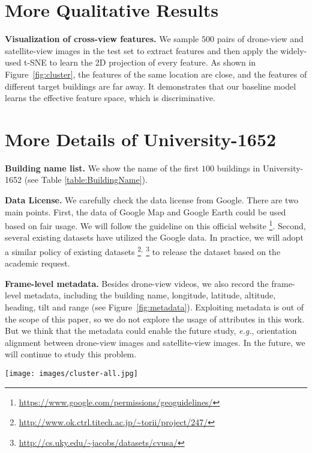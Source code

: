 \documentclass[sigconf]{acmart}
\def\eg{\emph{e.g.}}
\begin{document}
\section{More Qualitative Results}
\textbf{Visualization of cross-view features.} 
We sample $500$ pairs of drone-view and satellite-view images in the test set to extract features and then apply the widely-used t-SNE \cite{van2014accelerating} to learn the 2D projection of every feature. As shown in Figure~\ref{fig:cluster}, the features of the same location are close, and the features of different target buildings are far away. It demonstrates that our baseline model learns the effective feature space, which is discriminative.


\section{More Details of University-1652}

\textbf{Building name list.} We show the name of the first $100$ buildings in University-1652 (see Table \ref{table:BuildingName}). 

\noindent\textbf{Data License.} We carefully check the data license from Google. There are two main points.
First, the data of Google Map and Google Earth could be used based on fair usage. We will follow the guideline on this official website \footnote{\url{https://www.google.com/permissions/geoguidelines/}}.
Second, several existing datasets have utilized the Google data. In practice, we will adopt a similar policy of existing datasets \footnote{\url{http://www.ok.ctrl.titech.ac.jp/~torii/project/247/}}$^,$ 
\footnote{\url{http://cs.uky.edu/~jacobs/datasets/cvusa/}} to release the dataset based on the academic request. 

\noindent\textbf{Frame-level metadata.} Besides drone-view videos, we also record the frame-level metadata, including the building name, longitude, latitude, altitude, heading, tilt and range (see Figure~\ref{fig:metadata}). Exploiting metadata is out of the scope of this paper, so we do not explore the usage of attributes in this work. But we think that the metadata could enable the future study, \eg, orientation alignment between drone-view images and satellite-view images. In the future, we will continue to study this problem.





\begin{figure*}[t]
\begin{center}
    \texttt{[image: images/cluster-all.jpg]}
\end{center}
\caption{Visualization of cross-view features using t-SNE \cite{van2014accelerating} on University-1652. (Best viewed when zoomed in.)
     }\label{fig:cluster}
\end{figure*}
\end{document}
